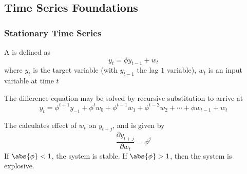 \subsection{Time Series Foundations}

\subsubsection{Stationary Time Series}

\begin{definition}
A  is defined as
\begin{equation*}
y_t = \phi y_{t-1} + w_t \nonumber
\end{equation*}
where $y_t$ is the target variable (with $y_{t-1}$ the lag $1$ variable), $w_t$ is an input variable at time $t$
\end{definition}

The difference equation may be solved by recursive substitution to arrive at
\begin{equation*}
y_t = \phi^{t+1}y_{-1} + \phi^{t} w_0 + \phi^{t-1} w_1 + \phi^{t-2} w_2 + \cdots + \phi w_{t-1} + w_t \nonumber
\end{equation*}

The  calculates effect of $w_t$ on $y_{t+j}$, and is given by
\begin{equation*}
\frac{\partial y_{t+j}}{\partial w_t} = \phi^j \nonumber
\end{equation*}
If $\abs{\phi} < 1$, the system is stable. If $\abs{\phi} > 1$, then the system is explosive.

